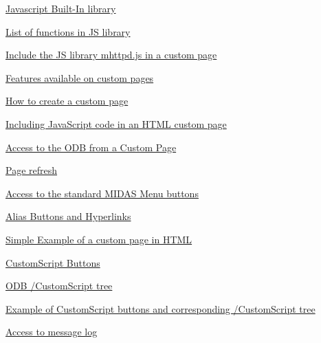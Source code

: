 \begin{TabularC}{2}
\begin{TabularC}{2}
\begin{DoxyItemize}
\begin{DoxyItemize}
\begin{DoxyItemize}
\begin{DoxyItemize}
\begin{DoxyItemize}
\item \hyperlink{RC_mhttpd_js}{Javascript Built-\/In library} 
\begin{DoxyItemize}
\item \hyperlink{RC_mhttpd_custom_js_lib_RC_mhttpd_js_library_features}{List of functions in JS library} 
\item \hyperlink{RC_mhttpd_custom_js_lib_RC_mhttpd_include_js_library}{Include the JS library mhttpd.js in a custom page} 
\end{DoxyItemize}
\end{DoxyItemize}
\item \hyperlink{RC_mhttpd_custom_features}{Features available on custom pages} 
\begin{DoxyItemize}
\item \hyperlink{RC_mhttpd_custom_features_RC_mhttpd_custom_create}{How to create a custom page} 
\begin{DoxyItemize}
\item \hyperlink{RC_mhttpd_custom_features_RC_mhttpd_custom_including_js}{Including JavaScript code in an HTML custom page} 
\item \hyperlink{RC_mhttpd_custom_features_RC_mhttpd_custom_key_access}{Access to the ODB from a Custom Page} 
\item \hyperlink{RC_mhttpd_custom_features_RC_mhttpd_custom_refresh}{Page refresh} 
\end{DoxyItemize}
\item \hyperlink{RC_mhttpd_custom_features_RC_mhttpd_custom_midas_buttons}{Access to the standard MIDAS Menu buttons} 
\item \hyperlink{RC_mhttpd_custom_features_RC_mhttpd_custom_alias}{Alias Buttons and Hyperlinks} 
\item \hyperlink{RC_mhttpd_custom_features_RC_mhttpd_custom_simple_example}{Simple Example of a custom page in HTML} 
\item \hyperlink{RC_mhttpd_custom_features_RC_mhttpd_custom_script_buttons}{CustomScript Buttons} 
\begin{DoxyItemize}
\item \hyperlink{RC_mhttpd_custom_features_RC_odb_customscript_tree}{ODB /CustomScript tree} 
\item \hyperlink{RC_mhttpd_custom_features_RC_mhttpd_customscript_example}{Example of CustomScript buttons and corresponding /CustomScript tree} 
\end{DoxyItemize}
\item \hyperlink{RC_mhttpd_custom_features_RC_mhttpd_custom_getmsg}{Access to message log} 

\end{DoxyItemize}
\end{DoxyItemize}
\end{DoxyItemize}
\end{DoxyItemize}
\end{DoxyItemize}
\end{TabularC}
\end{TabularC}
